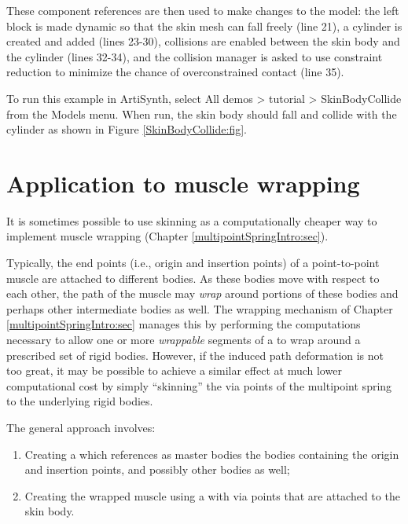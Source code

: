 These component references are then used to make changes to the model:
the left block is made dynamic so that the skin mesh can fall freely
(line 21), a cylinder is created and added (lines 23-30), collisions
are enabled between the skin body and the cylinder (lines 32-34), and
the collision manager is asked to use constraint reduction to minimize
the chance of overconstrained contact (line 35).

To run this example in ArtiSynth, select {\sf All demos > tutorial >
SkinBodyCollide} from the {\sf Models} menu. When run,
the skin body should fall and collide with the cylinder
as shown in Figure \ref{SkinBodyCollide:fig}.

\section{Application to muscle wrapping}
\label{skinBasedWrapping:sec}

It is sometimes possible to use skinning as a computationally cheaper
way to implement muscle wrapping (Chapter
\ref{multipointSpringIntro:sec}).

Typically, the end points (i.e., origin and insertion points) of a
point-to-point muscle are attached to different bodies. As these
bodies move with respect to each other, the path of the muscle may
{\it wrap} around portions of these bodies and perhaps other
intermediate bodies as well. The wrapping mechanism of Chapter
\ref{multipointSpringIntro:sec} manages this by performing the
computations necessary to allow one or more {\it wrappable} segments
of a  to wrap
around a prescribed set of rigid bodies. However, if the induced path
deformation is not too great, it may be possible to achieve a similar
effect at much lower computational cost by simply ``skinning'' the via
points of the multipoint spring to the underlying rigid bodies.

The general approach involves:

\begin{enumerate}

\item Creating a 
which references as master bodies the bodies containing the origin and
insertion points, and possibly other bodies as well;

\item Creating the wrapped muscle using a 
with via points that are attached to the skin body.
        
\end{enumerate}

